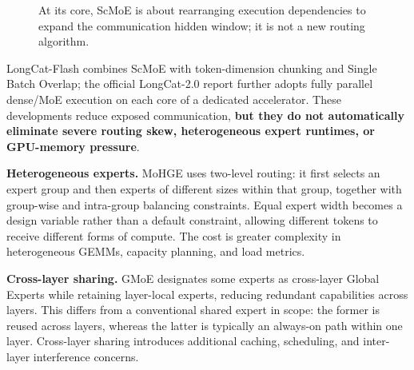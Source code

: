 \documentclass[10pt,a4paper,fontset=none]{ctexart}
\begin{document}
\begin{figure}[htbp]
\centering
{}
\caption{At its core, ScMoE is about rearranging execution dependencies to expand the communication hidden window; it is not a new routing algorithm.}
\label{fig:scmoe}
\end{figure}

LongCat-Flash combines ScMoE with token-dimension chunking and Single Batch Overlap; the official LongCat-2.0 report further adopts fully parallel dense/MoE execution on each core of a dedicated accelerator\cite{longcat2}. These developments reduce exposed communication, \textbf{but they do not automatically eliminate severe routing skew, heterogeneous expert runtimes, or GPU-memory pressure}.

\textbf{Heterogeneous experts.} MoHGE uses two-level routing: it first selects an expert group and then experts of different sizes within that group, together with group-wise and intra-group balancing constraints\cite{mohge2026}. Equal expert width becomes a design variable rather than a default constraint, allowing different tokens to receive different forms of compute. The cost is greater complexity in heterogeneous GEMMs, capacity planning, and load metrics.

\textbf{Cross-layer sharing.} GMoE designates some experts as cross-layer Global Experts while retaining layer-local experts, reducing redundant capabilities across layers\cite{gmoe2026}. This differs from a conventional shared expert in scope: the former is reused across layers, whereas the latter is typically an always-on path within one layer. Cross-layer sharing introduces additional caching, scheduling, and inter-layer interference concerns.
\end{document}
